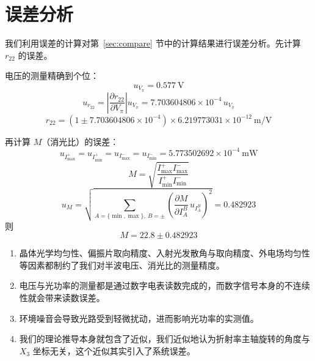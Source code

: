 \documentclass[10pt,twocolumn,a4paper]{article}
\begin{document}
	\section{误差分析}
	我们利用误差的计算对第~\ref{sec:compare} 节中的计算结果进行误差分析。先计算 $r_{22}$ 的误差。
	
	电压的测量精确到个位：
	\begin{equation}
		u_{V_\pi}  = 0.577\ \text{V}
	\end{equation}
	\begin{equation}
		u_{r_{22}} = \left|\frac{\partial r_{22}}{\partial V_\pi}\right| u_{V_\pi} =  7.703604806\times10^{-4}\,u_{V_\pi}
	\end{equation}
	\begin{equation}
		r_{22} = (1 \pm 7.703604806\times10^{-4})\times6.219773031\times10^{-12}\ \text{m/V}
	\end{equation}
	
	再计算 $M$（消光比）的误差：
	\begin{equation}
		u_{I_{\max}^+} = u_{I_{\min}^+} = u_{I_{\max}^-} = u_{I_{\min}^-} = 5.773502692\times10^{-4}\ \text{mW}
	\end{equation}
	\begin{equation}
		M = \sqrt{\frac{I_{\max}^+ I_{\max}^-}{I_{\min}^+ I_{\min}^-}}
	\end{equation}
	\begin{equation}
		u_{M} = \sqrt{\sum_{A=\{\min,\max\},\ B=\pm}\left(\frac{\partial M}{\partial I_{A}^B}\,u_{I_{A}^B}\right)^2} = 0.482923
	\end{equation}
	则
	\begin{equation}
		M = 22.8 \pm 0.482923
	\end{equation}
	
	\begin{enumerate}
		\item 晶体光学均匀性、偏振片取向精度、入射光发散角与取向精度、外电场均匀性等因素都制约了我们对半波电压、消光比的测量精度。
		\item 电压与光功率的测量都是通过数字电表读数完成的，而数字信号本身的不连续性就会带来读数误差。
		\item 环境噪音会导致光路受到轻微扰动，进而影响光功率的实测值。
		\item 我们的理论推导本身就包含了近似，我们近似地认为折射率主轴旋转的角度与 $X_3$ 坐标无关，这个近似其实引入了系统误差。
	\end{enumerate}
\end{document}

